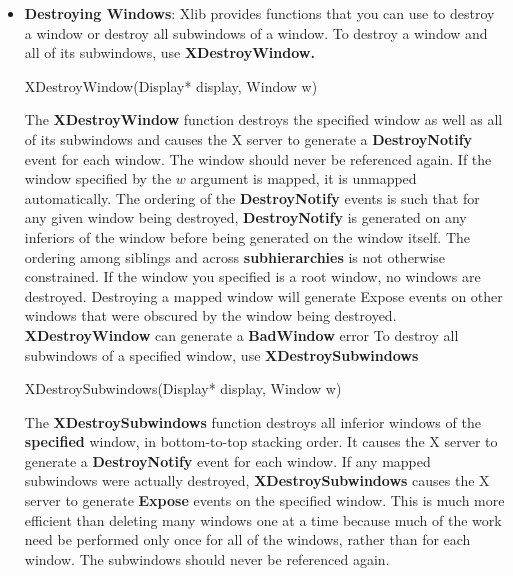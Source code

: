 \documentclass{report}
\begin{document}
\begin{itemize}
            \bigbreak \noindent 
            \textbf{XCreateSimpleWindow} can generate \textbf{BadAlloc,} \textbf{BadMatch,} \textbf{BadValue,} and \textbf{BadWindow} errors.
        \item \textbf{Destroying Windows}: Xlib provides functions that you can use to destroy a window or destroy all subwindows of a window.
            \bigbreak \noindent 
            To destroy a window and all of its subwindows, use \textbf{XDestroyWindow.}
            \bigbreak \noindent 
            \begin{cppcode}
            XDestroyWindow(Display* display, Window w)
            \end{cppcode}
            \bigbreak \noindent 
            The \textbf{XDestroyWindow} function destroys the specified window as well as all of its subwindows and causes the X server to generate a \textbf{DestroyNotify} event for each window. The window should never be referenced again. If the window specified by the $w$ argument is mapped, it is unmapped automatically. The ordering of the \textbf{DestroyNotify} events is such that for any given window being destroyed, \textbf{DestroyNotify} is generated on any inferiors of the window before being generated on the window itself. The ordering among siblings and across \textbf{subhierarchies} is not otherwise constrained. If the window you specified is a root window, no windows are destroyed. Destroying a mapped window will generate Expose events on other windows that were obscured by the window being destroyed.
            \bigbreak \noindent 
            \textbf{XDestroyWindow} can generate a \textbf{BadWindow} error
            \bigbreak \noindent 
            To destroy all subwindows of a specified window, use \textbf{XDestroySubwindows}
            \bigbreak \noindent 
            \begin{cppcode}
            XDestroySubwindows(Display* display, Window w) 
            \end{cppcode}
            \bigbreak \noindent 
            The \textbf{XDestroySubwindows} function destroys all inferior windows of the \textbf{speciﬁed} window, in bottom-to-top stacking order. It causes the X server to generate a \textbf{DestroyNotify} event for each window. If any mapped subwindows were actually destroyed, \textbf{XDestroySubwindows} causes the X server to generate \textbf{Expose} events on the specified window. This is much more efficient than deleting many windows one at a time because much of the work need be performed only once for all of the windows, rather than for each window. The subwindows should never be referenced again.

\end{itemize}
\end{document}
